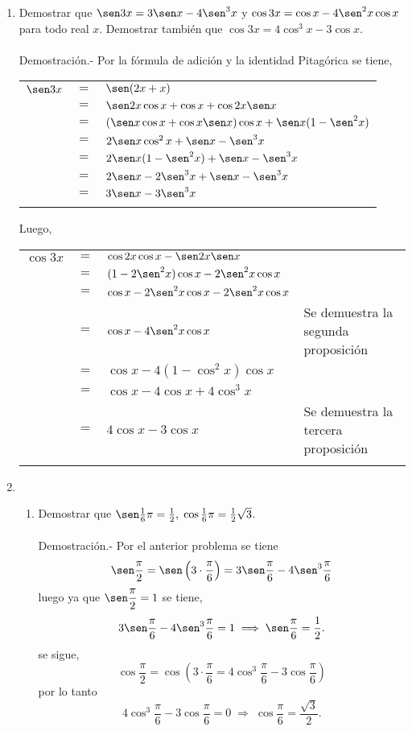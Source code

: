\begin{enumerate}[\bfseries 1.]
\item Demostrar que $\sen 3x = 3\sen x-4\sen^3 x $ y $\cos 3x = \cos x -4\sen^2 x \cos x$ para todo real $x$. Demostrar también que $\cos 3x=4\cos^3 x -3\cos x$.\\\\
	Demostración.-\; Por la fórmula de adición y la identidad Pitagórica se tiene,
	\begin{center}
	    \begin{tabular}{rcl}
		$\sen3x$&$=$&$\sen(2x+x)$\\
		&$=$&$\sen2x \cos x + \cos x + \cos 2x \sen x$\\
		&$=$&$(\sen x \cos x + \cos x \sen x)\cos x + \sen x(1-\sen^2x)$\\
		&$=$&$2\sen x \cos^2 x +\sen x - \sen^3 x$\\
		&$=$&$2\sen x(1-\sen^2 x)+\sen x -\sen^3 x$\\
		&$=$&$2\sen x - 2\sen^3 x + \sen x - \sen^3 x$\\
		&$=$&$3\sen x - 3 \sen^3 x$\\\\
	    \end{tabular}
	\end{center}
	 Luego,
	\begin{center}
	    \begin{tabular}{rcll}
		$\cos 3x$&$=$&$\cos 2x \cos x - \sen 2x \sen x$&\\
		&$=$&$(1-2\sen^2 x)\cos x - 2\sen^2 x \cos x$&\\
		&$=$&$\cos x - 2\sen^2 x \cos x - 2\sen^2 x \cos x$&\\
		&$=$&$\cos x - 4\sen^2 x \cos x$&Se demuestra la segunda proposición\\
		&$=$&$\cos x - 4(1-\cos^2x)\cos x$&\\
		&$=$&$\cos x - 4\cos x +4\cos^3 x$&\\
		&$=$&$4\cos x - 3 \cos x$&Se demuestra la tercera proposición\\\\
	    \end{tabular}
	\end{center}

\item 
\begin{enumerate}[\bfseries (a)]

    \item Demostrar que $\sen \frac{1}{6}\pi=\frac{1}{2},\; \cos \frac{1}{6}\pi = \frac{1}{2}\sqrt{3}$.\\\\
	Demostración.-\; Por el anterior problema se tiene $$\sen\dfrac{\pi}{2}=\sen\left(3\cdot \dfrac{\pi}{6}\right)  =3 \sen \dfrac{\pi}{6}-4\sen^3 \dfrac{\pi}{6}$$
	luego ya que $\sen\dfrac{\pi}{2}=1$ se tiene, 
	$$3\sen\dfrac{\pi}{6}-4\sen^3\dfrac{\pi}{6}=1 \; \Longrightarrow \; \sen\dfrac{\pi}{6}=\dfrac{1}{2}.$$
	se sigue, $$\cos\dfrac{\pi}{2}=\cos\left(3\cdot \dfrac{\pi}{6} = 4\cos^3\dfrac{\pi}{6}-3\cos\dfrac{\pi}{6}\right)$$
	por lo tanto $$4\cos^3\dfrac{\pi}{6}-3\cos\dfrac{\pi}{6}=0 \; \Longrightarrow \; \cos\dfrac{\pi}{6}=\dfrac{\sqrt{3}}{2}.$$\\


\end{enumerate}
\end{enumerate}
